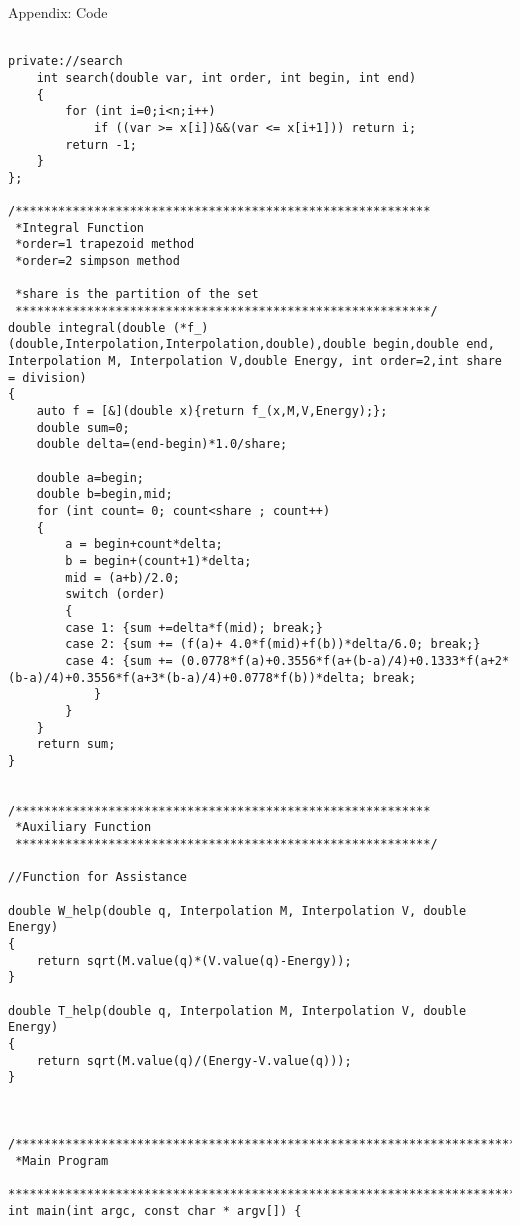 \documentclass[letterpaper,12pt]{article}
\begin{document}
\begin{section}{Appendix: Code}
\begin{lstlisting}
    
private://search
    int search(double var, int order, int begin, int end)
    {
        for (int i=0;i<n;i++)
            if ((var >= x[i])&&(var <= x[i+1])) return i;
        return -1;
    }
};

/**********************************************************
 *Integral Function
 *order=1 trapezoid method
 *order=2 simpson method
 
 *share is the partition of the set
 **********************************************************/
double integral(double (*f_)(double,Interpolation,Interpolation,double),double begin,double end, Interpolation M, Interpolation V,double Energy, int order=2,int share = division)
{
    auto f = [&](double x){return f_(x,M,V,Energy);};
    double sum=0;
    double delta=(end-begin)*1.0/share;
    
    double a=begin;
    double b=begin,mid;
    for (int count= 0; count<share ; count++)
    {
        a = begin+count*delta;
        b = begin+(count+1)*delta;
        mid = (a+b)/2.0;
        switch (order)
        {
        case 1: {sum +=delta*f(mid); break;}
        case 2: {sum += (f(a)+ 4.0*f(mid)+f(b))*delta/6.0; break;}
        case 4: {sum += (0.0778*f(a)+0.3556*f(a+(b-a)/4)+0.1333*f(a+2*(b-a)/4)+0.3556*f(a+3*(b-a)/4)+0.0778*f(b))*delta; break;
            }
        }
    }
    return sum;
}


/**********************************************************
 *Auxiliary Function
 **********************************************************/

//Function for Assistance

double W_help(double q, Interpolation M, Interpolation V, double Energy)
{
    return sqrt(M.value(q)*(V.value(q)-Energy));
}

double T_help(double q, Interpolation M, Interpolation V, double Energy)
{
    return sqrt(M.value(q)/(Energy-V.value(q)));
}



/*******************************************************************************************************************
 *Main Program
 *******************************************************************************************************************/
int main(int argc, const char * argv[]) {
    

\end{lstlisting}
\end{section}
\end{document}
